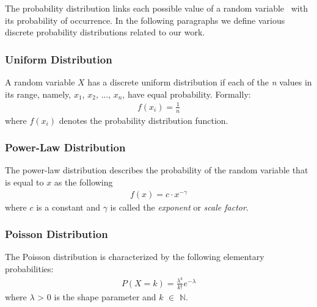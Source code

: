 The probability distribution links each possible value of a random variable~\cite{random_variable} with its probability of occurrence. In the following paragraphs we define various discrete probability distributions related to our work.

\subsubsection{Uniform Distribution}

A random variable $X$ has a discrete uniform distribution if each of the \textit{n} values in
its range, namely, $x_1$, $x_2$, ..., $x_n$, have equal probability. Formally:
\begin{align}
	f(x_i) = \frac{1}{n}
\end{align}
where $f(x_i)$ denotes the probability distribution function.

\subsubsection{Power-Law Distribution}


The power-law distribution describes the probability of the random variable that is equal to $x$ as the following
\begin{align}
	f(x) = c\cdot x^{-\gamma}
\end{align}
where $c$ is a constant and $\gamma$ is called the \textit{exponent} or \textit{scale factor}.

\subsubsection{Poisson Distribution}
The Poisson distribution is characterized by the following elementary probabilities:
\begin{align}
	P(X = k) = \frac{\lambda^k}{k!}e^{-\lambda}
\end{align}
where $\lambda$ > 0 is the shape parameter and $k$ $\in$ $\mathbb{N}$.

